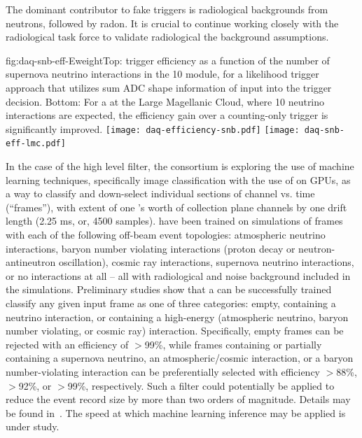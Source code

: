 The dominant contributor to fake  triggers is
radiological backgrounds from neutrons, followed by radon. It is
crucial to continue working closely with the radiological task force
to validate radiological the background assumptions.

\begin{dunefigure}{fig:daq-snb-eff-Eweight}{Top:  trigger
    efficiency as a function of the number of supernova neutrino
    interactions in the \SI{10}{\kt} module, for a likelihood trigger
    approach that utilizes sum ADC shape information of
     input into the trigger decision. Bottom:
    For a  at the Large Magellanic Cloud, where 10 neutrino
  interactions are expected, the efficiency gain over a counting-only
  trigger is significantly improved. } %
\texttt{[image: daq-efficiency-snb.pdf]}%
\newline
\texttt{[image: daq-snb-eff-lmc.pdf]}%
\end{dunefigure}

In the case of the high level filter, the consortium is exploring the
use of machine learning techniques, specifically image classification
with the use of  on GPUs, as a way to
classify and down-select individual sections of  channel vs. time
(``frames''), with extent of one 's worth of collection plane
channels by one drift length (2.25 ms, or, 4500 samples).  have
been trained on  simulations of frames with each of
the following off-beam event topologies: 
atmospheric neutrino interactions, baryon number violating
interactions (proton decay or neutron-antineutron oscillation), cosmic
ray interactions, supernova neutrino interactions, or no interactions at all -- all
with radiological and noise background included in the
simulations. Preliminary studies show that a  can be successfully trained classify any
given input frame as one of three categories: empty, containing a  neutrino
interaction, or containing a high-energy (atmospheric neutrino, baryon
number violating, or cosmic ray) interaction. Specifically, empty frames can be
rejected with an efficiency of $>$99\%, while frames containing or
partially containing 
a supernova neutrino, an atmospheric/cosmic interaction, or a baryon
number-violating interaction can be preferentially selected with efficiency
$>$88\%, $>$92\%, or $>$99\%, respectively. Such a 
filter could potentially be applied to reduce the event record size by
more than two orders of magnitude. Details may be found in~.
The speed at which machine learning inference may be applied is under study.




